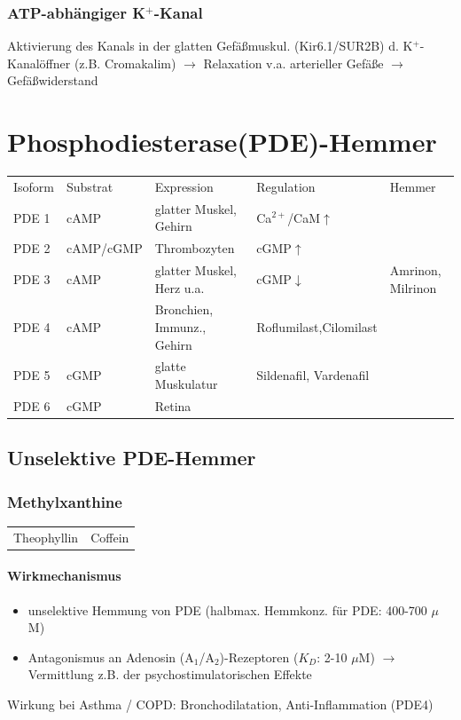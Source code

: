 \documentclass[10pt,a4paper]{report}
\begin{document}
\subsubsection{ATP-abhängiger K$^+$-Kanal}

Aktivierung des Kanals in der glatten Gefäßmuskul. (Kir6.1/SUR2B) d. K$^+$-Kanalöffner (z.B. Cromakalim) $\rightarrow$ Relaxation v.a. arterieller Gefäße $\rightarrow$ Gefäßwiderstand 

\section{Phosphodiesterase(PDE)-Hemmer}

\begin{tabularx}{\textwidth}{XXXXX}
Isoform&Substrat&Expression&Regulation&Hemmer\\
PDE 1&cAMP&glatter Muskel, Gehirn&Ca$^{2+}$/CaM$\uparrow$\\  
PDE 2&cAMP/cGMP&Thrombozyten&cGMP$\uparrow$\\
PDE 3&cAMP&glatter Muskel, Herz u.a.&cGMP$\downarrow$&Amrinon, Milrinon\\
PDE 4&cAMP&Bronchien, Immunz., Gehirn&Roflumilast,Cilomilast\\
PDE 5&cGMP&glatte Muskulatur&Sildenafil, Vardenafil\\
PDE 6&cGMP&Retina&&\\
\end{tabularx}

\subsection{Unselektive PDE-Hemmer}
\subsubsection{Methylxanthine}

\begin{tabularx}{\textwidth}{XX}
Theophyllin&Coffein\\
\end{tabularx}

\paragraph{Wirkmechanismus}
\begin{itemize}
	\item unselektive Hemmung von PDE (halbmax. Hemmkonz. für PDE: 400-700 $\mu$ M) 
	\item Antagonismus an Adenosin (A$_1$/A$_2$)-Rezeptoren ($K_D$: 2-10 $\mu$M)
	$\rightarrow$ Vermittlung z.B. der psychostimulatorischen Effekte
\end{itemize}
Wirkung bei Asthma / COPD: Bronchodilatation, Anti-Inflammation (PDE4)
\end{document}
